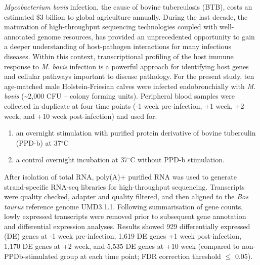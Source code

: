 \documentclass[\main/boa.tex]{subfiles}
\begin{document}
\vskip 0.8cm

\emph{Mycobacterium bovis} infection, the cause of bovine tuberculosis
(BTB), costs an estimated \$3 billion to global agriculture annually.
During the last decade, the maturation of high-throughput sequencing
technologies coupled with well-annotated genome resources, has provided
an unprecedented opportunity to gain a deeper understanding of
host-pathogen interactions for many infectious diseases. Within this
context, transcriptional profiling of the host immune response to
\emph{M. bovis} infection is a powerful approach for identifying host
genes and cellular pathways important to disease pathology. For the
present study, ten age-matched male Holstein-Friesian calves were
infected endobronchially with \emph{M. bovis} (\textasciitilde{}2,000
CFU -- colony forming units). Peripheral blood samples were collected in
duplicate at four time points (-1 week pre-infection, +1 week, +2 week,
and +10 week post-infection) and used for:

\begin{enumerate}
\def\labelenumi{\alph{enumi}.}
\tightlist
\item
  an overnight stimulation with purified protein derivative of bovine
  tuberculin (PPD-b) at 37\(^\circ\)C
\item
  a control overnight incubation at 37\(^\circ\)C without PPD-b
  stimulation.
\end{enumerate}

After isolation of total RNA, poly(A)+ purified RNA was used to generate
strand-specific RNA-seq libraries for high-throughput sequencing.
Transcripts were quality checked, adapter and quality filtered, and then
aligned to the \emph{Bos taurus} reference genome UMD3.1.1. Following
summarisation of gene counts, lowly expressed transcripts were removed
prior to subsequent gene annotation and differential expression
analyses. Results showed 929 differentially expressed (DE) genes at -1
week pre-infection, 1,619 DE genes +1 week post-infection, 1,170 DE
genes at +2 week, and 5,535 DE genes at +10 week (compared to
non-PPDb-stimulated group at each time point; FDR correction threshold
\(\leq\) 0.05).
\end{document}
